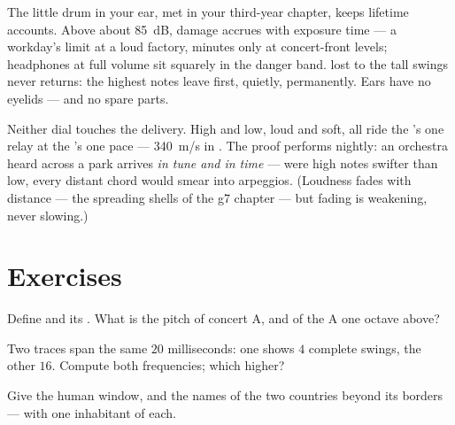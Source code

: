 \begin{remark}\label{rem:g8:sound-pitch-loudness:earsafety}
The little drum in your ear, met in your third-year chapter,
keeps lifetime accounts. Above about \qty{85}{dB}, damage
accrues with exposure time --- a workday's limit at a loud
factory, minutes only at concert-front levels; headphones at
full volume sit squarely in the danger band.  lost to
the tall swings never returns: the highest notes leave first,
quietly, permanently. Ears have no eyelids --- and no spare
parts.
\end{remark}

\begin{example}\label{ex:g8:sound-pitch-loudness:speed}
Neither dial touches the delivery. High and low, loud and
soft, all  ride the 's one relay at the 's
one pace --- \qty{340}{m/s} in . The proof performs
nightly: an orchestra heard across a park arrives \emph{in
tune and in time} --- were high notes swifter than low, every
distant chord would smear into arpeggios. (Loudness fades
with distance --- the spreading shells of the g7 chapter ---
but fading is weakening, never slowing.)
\end{example}

\section{Exercises}

\begin{exercise}[$\star$]\label{exo:g8:sound-pitch-loudness:1}
Define  and its . What is the pitch of concert
A, and of the A one octave above?
\end{exercise}

\begin{exercise}[$\star$]\label{exo:g8:sound-pitch-loudness:2}
Two traces span the same $20$ milliseconds: one shows $4$
complete swings, the other $16$. Compute both frequencies;
which  higher?
\end{exercise}

\begin{exercise}[$\star$]\label{exo:g8:sound-pitch-loudness:3}
Give the human  window, and the names of the two
countries beyond its borders --- with one inhabitant of
each.
\end{exercise}

